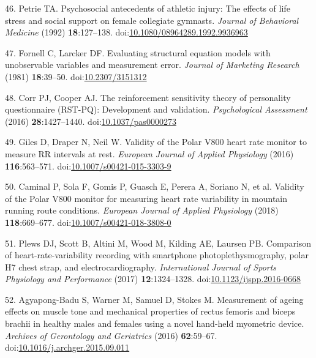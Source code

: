 \documentclass[
  english,
  man]{apa6}
\newenvironment{cslreferences}%
  {}%
  {\par}
\begin{document}
\begin{cslreferences}
\leavevmode\hypertarget{ref-Petrie1992}{}%
46. Petrie TA. Psychosocial antecedents of athletic injury: The effects of life stress and social support on female collegiate gymnasts. \emph{Journal of Behavioral Medicine} (1992) \textbf{18}:127--138. doi:\href{https://doi.org/10.1080/08964289.1992.9936963}{10.1080/08964289.1992.9936963}

\leavevmode\hypertarget{ref-Fornell1981}{}%
47. Fornell C, Larcker DF. Evaluating structural equation models with unobservable variables and measurement error. \emph{Journal of Marketing Research} (1981) \textbf{18}:39--50. doi:\href{https://doi.org/10.2307/3151312}{10.2307/3151312}

\leavevmode\hypertarget{ref-Corr2016c}{}%
48. Corr PJ, Cooper AJ. The reinforcement sensitivity theory of personality questionnaire (RST-PQ): Development and validation. \emph{Psychological Assessment} (2016) \textbf{28}:1427--1440. doi:\href{https://doi.org/10.1037/pas0000273}{10.1037/pas0000273}

\leavevmode\hypertarget{ref-Giles2016}{}%
49. Giles D, Draper N, Neil W. Validity of the Polar V800 heart rate monitor to measure RR intervals at rest. \emph{European Journal of Applied Physiology} (2016) \textbf{116}:563--571. doi:\href{https://doi.org/10.1007/s00421-015-3303-9}{10.1007/s00421-015-3303-9}

\leavevmode\hypertarget{ref-Caminal2018}{}%
50. Caminal P, Sola F, Gomis P, Guasch E, Perera A, Soriano N, et al. Validity of the Polar V800 monitor for measuring heart rate variability in mountain running route conditions. \emph{European Journal of Applied Physiology} (2018) \textbf{118}:669--677. doi:\href{https://doi.org/10.1007/s00421-018-3808-0}{10.1007/s00421-018-3808-0}

\leavevmode\hypertarget{ref-Plews2017}{}%
51. Plews DJ, Scott B, Altini M, Wood M, Kilding AE, Laursen PB. Comparison of heart-rate-variability recording with smartphone photoplethysmography, polar H7 chest strap, and electrocardiography. \emph{International Journal of Sports Physiology and Performance} (2017) \textbf{12}:1324--1328. doi:\href{https://doi.org/10.1123/ijspp.2016-0668}{10.1123/ijspp.2016-0668}

\leavevmode\hypertarget{ref-Agyapong-Badu2016}{}%
52. Agyapong-Badu S, Warner M, Samuel D, Stokes M. Measurement of ageing effects on muscle tone and mechanical properties of rectus femoris and biceps brachii in healthy males and females using a novel hand-held myometric device. \emph{Archives of Gerontology and Geriatrics} (2016) \textbf{62}:59--67. doi:\href{https://doi.org/10.1016/j.archger.2015.09.011}{10.1016/j.archger.2015.09.011}


\end{cslreferences}
\end{document}
